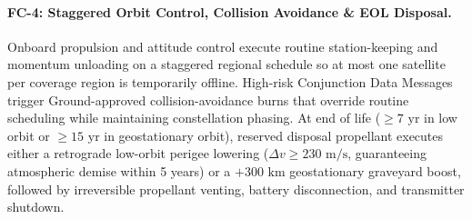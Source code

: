 \paragraph{FC-4: Staggered Orbit Control, Collision Avoidance \& EOL Disposal.}
Onboard propulsion and attitude control execute routine station-keeping and momentum unloading on a staggered regional schedule so at most one satellite per coverage region is temporarily offline. High-risk Conjunction Data Messages trigger Ground-approved collision-avoidance burns that override routine scheduling while maintaining constellation phasing. At end of life ($\ge 7\text{ yr}$ in low orbit or $\ge 15\text{ yr}$ in geostationary orbit), reserved disposal propellant executes either a retrograde low-orbit perigee lowering ($\Delta v \ge 230\text{ m/s}$, guaranteeing atmospheric demise within 5 years) or a $+300\text{ km}$ geostationary graveyard boost, followed by irreversible propellant venting, battery disconnection, and transmitter shutdown.

\newpage
